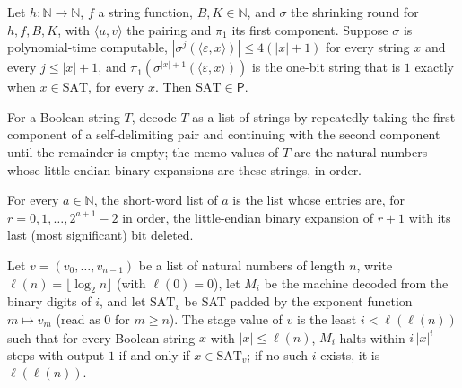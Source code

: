 \begin{theorem}
\label{Complexity.ladner_shrinking_transfer}
\leanok
{}
Let $h:\mathbb N\to\mathbb N$, $f$ a string function, $B,K\in\mathbb N$, and $\sigma$ the
shrinking round for $h,f,B,K$, with $\langle u,v\rangle$ the pairing and $\pi_1$ its first
component. Suppose $\sigma$ is polynomial-time computable,
$|\sigma^{j}(\langle\varepsilon,x\rangle)|\le 4(|x|+1)$ for every string $x$ and every
$j\le|x|+1$, and $\pi_1(\sigma^{|x|+1}(\langle\varepsilon,x\rangle))$ is the one-bit string
that is $1$ exactly when $x\in\mathrm{SAT}$, for every $x$. Then $\mathrm{SAT}\in\mathsf{P}$.
\end{theorem}

\begin{definition}
\label{Complexity.ladner_values}
\leanok
{}
For a Boolean string $T$, decode $T$ as a list of strings by repeatedly taking the first
component of a self-delimiting pair and continuing with the second component until the
remainder is empty; the memo values of $T$ are the natural numbers whose little-endian
binary expansions are these strings, in order.
\end{definition}

\begin{definition}
\label{Complexity.ladner_shortWords}
\leanok
For every $a\in\mathbb N$, the short-word list of $a$ is the list whose entries are, for
$r=0,1,\dots,2^{a+1}-2$ in order, the little-endian binary expansion of $r+1$ with its last
(most significant) bit deleted.
\end{definition}

\begin{definition}
\label{Complexity.ladner_stage}
\leanok
{}
Let $v=(v_0,\dots,v_{n-1})$ be a list of natural numbers of length $n$, write
$\ell(n)=\lfloor\log_2 n\rfloor$ (with $\ell(0)=0$), let $M_i$ be the machine decoded from
the binary digits of $i$, and let $\mathrm{SAT}_v$ be SAT padded by the exponent function
$m\mapsto v_m$ (read as $0$ for $m\ge n$). The stage value of $v$ is the least
$i<\ell(\ell(n))$ such that for every Boolean string $x$ with $|x|\le\ell(n)$, $M_i$ halts
within $i\,|x|^i$ steps with output $1$ if and only if $x\in\mathrm{SAT}_v$; if no such $i$
exists, it is $\ell(\ell(n))$.
\end{definition}

